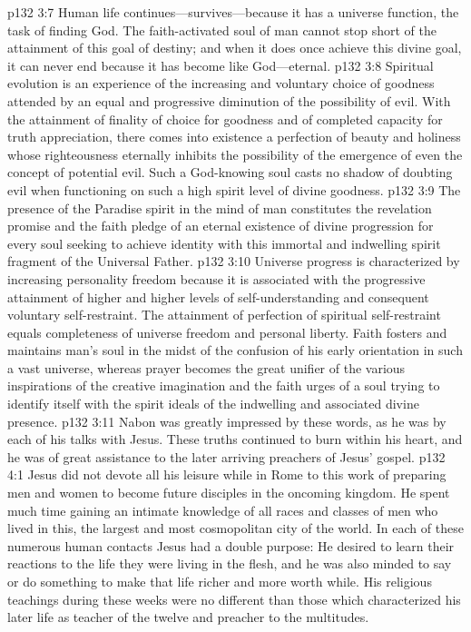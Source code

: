 \vs p132 3:7 Human life continues---survives---because it has a universe function, the task of finding God. The faith\hyp{}activated soul of man cannot stop short of the attainment of this goal of destiny; and when it does once achieve this divine goal, it can never end because it has become like God---eternal.
\pc \vs p132 3:8 Spiritual evolution is an experience of the increasing and voluntary choice of goodness attended by an equal and progressive diminution of the possibility of evil. With the attainment of finality of choice for goodness and of completed capacity for truth appreciation, there comes into existence a perfection of beauty and holiness whose righteousness eternally inhibits the possibility of the emergence of even the concept of potential evil. Such a God\hyp{}knowing soul casts no shadow of doubting evil when functioning on such a high spirit level of divine goodness.
\vs p132 3:9 The presence of the Paradise spirit in the mind of man constitutes the revelation promise and the faith pledge of an eternal existence of divine progression for every soul seeking to achieve identity with this immortal and indwelling spirit fragment of the Universal Father.
\vs p132 3:10 Universe progress is characterized by increasing personality freedom because it is associated with the progressive attainment of higher and higher levels of self\hyp{}understanding and consequent voluntary self\hyp{}restraint. The attainment of perfection of spiritual self\hyp{}restraint equals completeness of universe freedom and personal liberty. Faith fosters and maintains man’s soul in the midst of the confusion of his early orientation in such a vast universe, whereas prayer becomes the great unifier of the various inspirations of the creative imagination and the faith urges of a soul trying to identify itself with the spirit ideals of the indwelling and associated divine presence.
\pc \vs p132 3:11 Nabon was greatly impressed by these words, as he was by each of his talks with Jesus. These truths continued to burn within his heart, and he was of great assistance to the later arriving preachers of Jesus’ gospel.
\vs p132 4:1 Jesus did not devote all his leisure while in Rome to this work of preparing men and women to become future disciples in the oncoming kingdom. He spent much time gaining an intimate knowledge of all races and classes of men who lived in this, the largest and most cosmopolitan city of the world. In each of these numerous human contacts Jesus had a double purpose: He desired to learn their reactions to the life they were living in the flesh, and he was also minded to say or do something to make that life richer and more worth while. His religious teachings during these weeks were no different than those which characterized his later life as teacher of the twelve and preacher to the multitudes.
